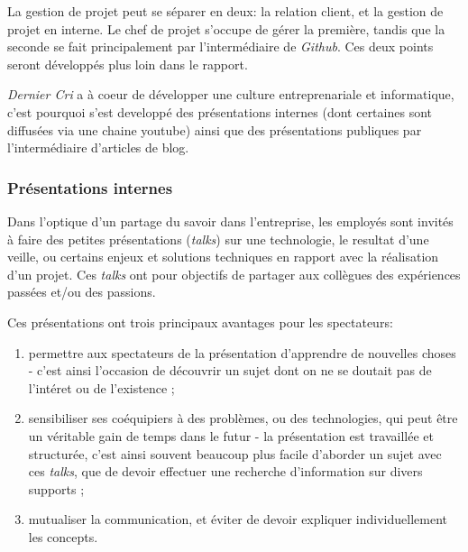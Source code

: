 \documentclass[12pt,a4paper]{article}
\providecommand{\tightlist}{%
  \setlength{\itemsep}{0pt}\setlength{\parskip}{0pt}}
\begin{document}
  \bigskip

  La gestion de projet peut se séparer en deux: la relation client, et la
  gestion de projet en interne. Le chef de projet s'occupe de gérer la
  première, tandis que la seconde se fait principalement par
  l'intermédiaire de \emph{Github}. Ces deux points seront développés plus
  loin dans le rapport.

  \bigskip

  \emph{Dernier Cri} a à coeur de développer une culture entreprenariale
  et informatique, c'est pourquoi s'est developpé des présentations
  internes (dont certaines sont diffusées via une chaine youtube) ainsi
  que des présentations publiques par l'intermédiaire d'articles de blog.

  \subsubsection{Présentations internes}\label{pruxe9sentations-internes}

  \bigskip

  Dans l'optique d'un partage du savoir dans l'entreprise, les employés
  sont invités à faire des petites présentations (\emph{talks}) sur une
  technologie, le resultat d'une veille, ou certains enjeux et solutions
  techniques en rapport avec la réalisation d'un projet. Ces \emph{talks}
  ont pour objectifs de partager aux collègues des expériences passées
  et/ou des passions.

  \bigskip

  Ces présentations ont trois principaux avantages pour les spectateurs:

  \begin{enumerate}
  \def\labelenumi{\arabic{enumi}.}
  \tightlist
  \item
    permettre aux spectateurs de la présentation d'apprendre de nouvelles
    choses - c'est ainsi l'occasion de découvrir un sujet dont on ne se
    doutait pas de l'intéret ou de l'existence ;\\
  \item
    sensibiliser ses coéquipiers à des problèmes, ou des technologies, qui
    peut être un véritable gain de temps dans le futur - la présentation
    est travaillée et structurée, c'est ainsi souvent beaucoup plus facile
    d'aborder un sujet avec ces \emph{talks}, que de devoir effectuer une
    recherche d'information sur divers supports ;\\
  \item
    mutualiser la communication, et éviter de devoir expliquer
    individuellement les concepts.
  \end{enumerate}
\end{document}
